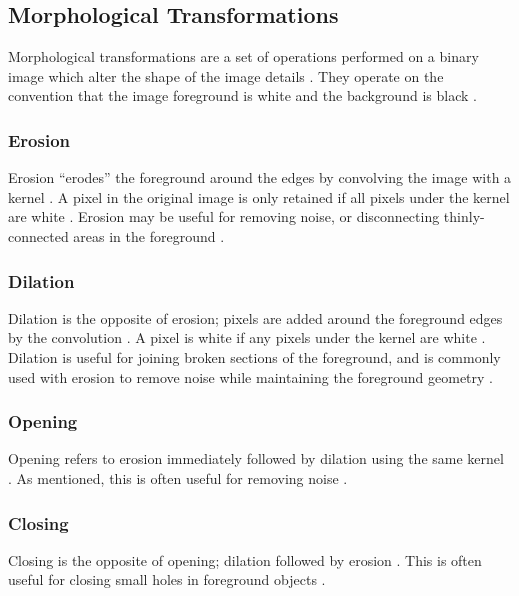 \newpage
\subsection{Morphological Transformations}

Morphological transformations are a set of operations performed on a binary image which alter the shape of the image details \cite{opencv_mt}. They operate on the convention that the image foreground is white and the background is black \cite{opencv_mt}.

\subsubsection*{Erosion}

Erosion ``erodes'' the foreground around the edges by convolving the image with a kernel \cite{opencv_mt}. A pixel in the original image is only retained if all pixels under the kernel are white \cite{opencv_mt}. Erosion may be useful for removing noise, or disconnecting thinly-connected areas in the foreground \cite{opencv_mt}.

\subsubsection*{Dilation}

Dilation is the opposite of erosion; pixels are added around the foreground edges by the convolution \cite{opencv_mt}. A pixel is white if any pixels under the kernel are white \cite{opencv_mt}. Dilation is useful for joining broken sections of the foreground, and is commonly used with erosion to remove noise while maintaining the foreground geometry \cite{opencv_mt}.

\subsubsection*{Opening}

Opening refers to erosion immediately followed by dilation using the same kernel \cite{opencv_mt}. As mentioned, this is often useful for removing noise \cite{opencv_mt}.

\subsubsection*{Closing}

Closing is the opposite of opening; dilation followed by erosion \cite{opencv_mt}. This is often useful for closing small holes in foreground objects \cite{opencv_mt}.

